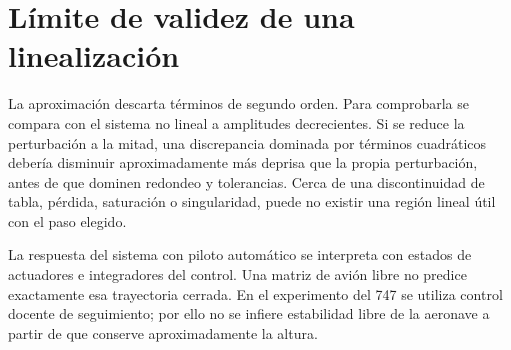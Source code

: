 \section{Límite de validez de una linealización}
La aproximación descarta términos de segundo orden. Para comprobarla se compara con el sistema no lineal a amplitudes decrecientes. Si se reduce la perturbación a la mitad, una discrepancia dominada por términos cuadráticos debería disminuir aproximadamente más deprisa que la propia perturbación, antes de que dominen redondeo y tolerancias. Cerca de una discontinuidad de tabla, pérdida, saturación o singularidad, puede no existir una región lineal útil con el paso elegido.

La respuesta del sistema con piloto automático se interpreta con estados de actuadores e integradores del control. Una matriz de avión libre no predice exactamente esa trayectoria cerrada. En el experimento del 747 se utiliza control docente de seguimiento; por ello no se infiere estabilidad libre de la aeronave a partir de que conserve aproximadamente la altura.
